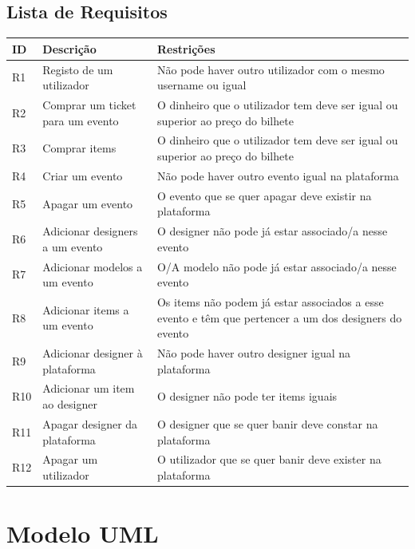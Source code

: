 \documentclass{article}
\begin{document}
\subsection{Lista de Requisitos}
\begin{center}
\begin{tabular}{ |p{1cm}|p{5cm}|p{8cm}|  }
\hline
 ID & Descrição & Restrições \\
\hline
R1 & Registo de um utilizador & Não pode haver outro utilizador com o mesmo username  ou igual \\
\hline
R2 & Comprar um ticket para um evento  & O dinheiro que o utilizador tem deve ser igual ou superior ao preço do bilhete \\
\hline
R3 & Comprar items & O dinheiro que o utilizador tem deve ser igual ou superior ao preço do bilhete \\
\hline
R4 & Criar um evento & Não pode haver outro evento igual na plataforma\\
\hline
R5 & Apagar um evento & O evento que se quer apagar deve existir na plataforma \\
\hline
R6 & Adicionar designers a um evento & O designer não pode já estar associado/a nesse evento \\
\hline
R7 & Adicionar modelos  a um evento & O/A modelo não pode já estar associado/a nesse evento  \\
\hline
R8 & Adicionar items a um evento & Os items não podem já estar associados a esse evento e têm que pertencer a um dos designers do evento\\
\hline
R9 & Adicionar designer à plataforma & Não pode haver outro designer igual na plataforma \\
\hline
R10 & Adicionar um item ao designer & O designer não pode ter items iguais \\
\hline
R11 & Apagar designer da plataforma & O designer que se quer banir deve constar na plataforma\\
\hline
R12 & Apagar um utilizador & O utilizador que se quer banir deve exister na plataforma \\
\hline
\end{tabular}
\end{center}
\section{Modelo UML}
\end{document}
